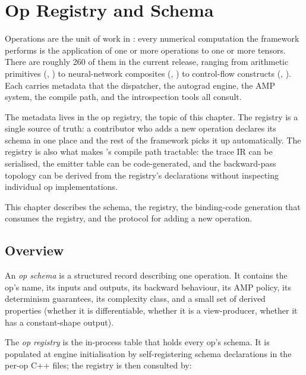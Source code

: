 \chapter{Op Registry and Schema}
\label{ch:op_registry}

Operations are the unit of work in \Lucid: every numerical
computation the framework performs is the application of one or
more operations to one or more tensors. There are roughly 260 of
them in the current release, ranging from arithmetic primitives
(, ) to neural-network composites
(, ) to control-flow
constructs (, ). Each carries
metadata that the dispatcher, the autograd engine, the AMP system,
the compile path, and the introspection tools all consult.

The metadata lives in the op registry, the topic of this chapter.
The registry is a single source of truth: a contributor who adds a
new operation declares its schema in one place and the rest of the
framework picks it up automatically. The registry is also what
makes \Lucid's compile path tractable: the trace IR can be
serialised, the emitter table can be code-generated, and the
backward-pass topology can be derived from the registry's
declarations without inspecting individual op implementations.

This chapter describes the schema, the registry, the binding-code
generation that consumes the registry, and the protocol for adding
a new operation.

\section{Overview}
\label{sec:op_registry:overview}

An \emph{op schema} is a structured record describing one
operation. It contains the op's name, its inputs and outputs, its
backward behaviour, its AMP policy, its determinism guarantees, its
complexity class, and a small set of derived properties (whether it
is differentiable, whether it is a view-producer, whether it has a
constant-shape output).

The \emph{op registry} is the in-process table that holds every
op's schema. It is populated at engine initialisation by
self-registering schema declarations in the per-op C++ files; the
registry is then consulted by:

